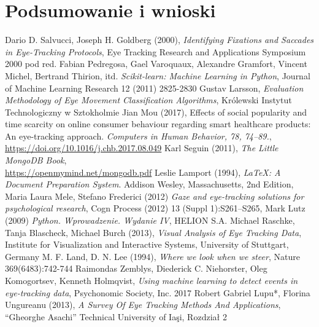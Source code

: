 \documentclass[14pt,a4paper,twoside,openright,titlepage]{extbook}
\begin{document}
    \chapter{Podsumowanie i wnioski}
        \blindtext
    \backmatter
    \fancyhf{}
    \pagestyle{plain}
    \renewcommand{\headrulewidth}{0pt}
    \begin{thebibliography}{99}
            Dario D. Salvucci, Joseph H. Goldberg (2000),
            \emph{Identifying Fixations and Saccades in Eye-Tracking Protocols},
            Eye Tracking Research and Applications Symposium 2000
            pod red. Fabian Pedregosa, Gael Varoquaux, Alexandre Gramfort, Vincent Michel, Bertrand Thirion, itd.
            \emph{Scikit-learn: Machine Learning in Python},
            Journal of Machine Learning Research 12 (2011) 2825-2830
            Gustav Larsson,
            \emph{Evaluation Methodology of Eye
            Movement Classification Algorithms},
            Królewski Instytut Technologiczny w Sztokholmie
            Jian Mou (2017),
            Effects of social popularity and time scarcity on online consumer behaviour regarding smart healthcare products: An eye-tracking approach. \emph{Computers in Human Behavior, 78, 74–89.},
            \url{https://doi.org/10.1016/j.chb.2017.08.049}
            Karl Seguin (2011),
            \emph{The Little MongoDB Book},\\
            \url{https://openmymind.net/mongodb.pdf}
            Leslie Lamport (1994),
            \emph{\LaTeX: A Document Preparation System}.
            Addison Wesley, Massachusetts,
            2nd Edition,
            Maria Laura Mele, Stefano Frederici (2012)
            \emph{Gaze and eye-tracking solutions for psychological research},
            Cogn Process (2012) 13 (Suppl 1):S261–S265,
            Mark Lutz (2009)
            \emph{Python. Wprowadzenie. Wydanie IV},
            HELION S.A.
            Michael Raschke, Tanja Blascheck, Michael Burch (2013),
            \emph{Visual Analysis of Eye Tracking Data},
            Institute for Visualization and Interactive Systems, University of Stuttgart, Germany
            M. F. Land, D. N. Lee (1994),
            \emph{Where we look when we steer},
            Nature 369(6483):742-744
            Raimondas Zemblys, Diederick C. Niehorster, Oleg Komogortsev, Kenneth Holmqvist,
            \emph{Using machine learning to detect events in eye-tracking data},
            Psychonomic Society, Inc. 2017
            Robert Gabriel Lupu*, Florina Ungureanu (2013),
            \emph{A Survey Of Eye Tracking Methods And Applications},
            “Gheorghe Asachi” Technical University of Iaşi,
            Rozdział 2
    \end{thebibliography}
\end{document}
